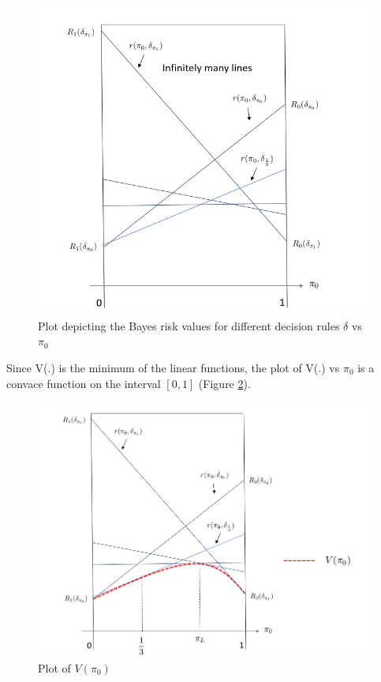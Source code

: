 \documentclass[12pt]{report}
\begin{document}
\begin{figure}[htbp]
	\begin{center}
		\includegraphics[scale = 0.5]{Figures/BayesRiskLines.png}
		\caption{Plot depicting the Bayes risk values for different decision rules $\delta$ vs $\pi_0$}
		\label{fig:bayesrisklines}
	\end{center}
\end{figure}

\newpage 
\noindent Since V(.) is the minimum of the linear functions, the plot of V(.) vs $\pi_0$ is a convace function on the interval $[0,1]$ (Figure \ref{fig:wishfulthinking}).

\begin{figure}[htbp]
	\begin{center}
		\includegraphics[scale = 0.4]{Figures/WishfulThinking.png}
		\caption{Plot of $V(\pi_0)$}
		\label{fig:wishfulthinking}
	\end{center}
\end{figure}
\end{document}
